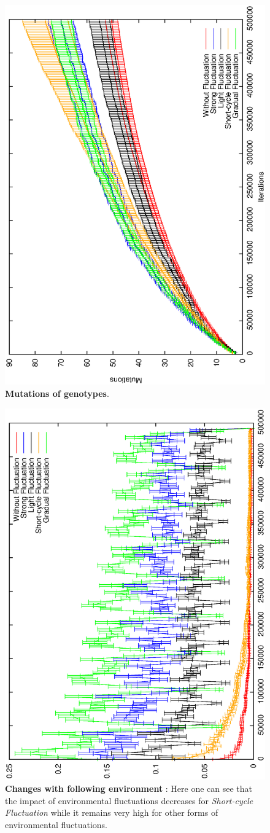 \documentclass[letterpaper]{article}
\begin{document}
\begin{figure}[h]
\centering
\includegraphics[width=0.7\columnwidth, angle =-90 ]{Mutations}
\caption{\textbf{Mutations of genotypes}.
}
\label{Mutations}
\end{figure}

\begin{figure}[h]
\centering
\includegraphics[width=0.7\columnwidth, angle =-90 ]{diffProp}
\caption{\textbf{Changes with following environment} : Here one can see that the impact of environmental fluctuations decreases for \emph{Short-cycle  Fluctuation} while it remains very high for other forms of environmental fluctuations.
}
\label{Mutations}
\end{figure}
\end{document}

